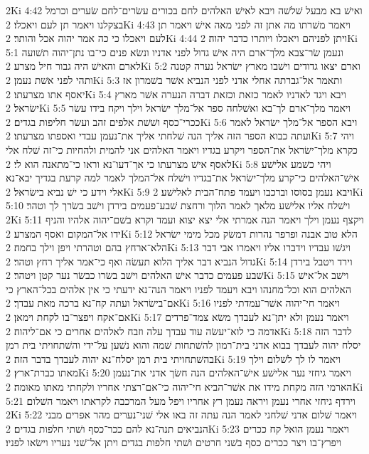 2Ki 4:42  ואישׁ בא מבעל שׁלשׁה ויבא לאישׁ האלהים לחם בכורים עשׂרים־לחם שׂערים וכרמל בצקלנו ויאמר תן לעם ויאכלו׃
2Ki 4:43  ויאמר משׁרתו מה אתן זה לפני מאה אישׁ ויאמר תן לעם ויאכלו כי כה אמר יהוה אכל והותר׃
2Ki 4:44  ויתן לפניהם ויאכלו ויותרו כדבר יהוה׃
2Ki 5:1  ונעמן שׂר־צבא מלך־ארם היה אישׁ גדול לפני אדניו ונשׂא פנים כי־בו נתן־יהוה תשׁועה לארם והאישׁ היה גבור חיל מצרע׃
2Ki 5:2  וארם יצאו גדודים וישׁבו מארץ ישׂראל נערה קטנה ותהי לפני אשׁת נעמן׃
2Ki 5:3  ותאמר אל־גברתה אחלי אדני לפני הנביא אשׁר בשׁמרון אז יאסף אתו מצרעתו׃
2Ki 5:4  ויבא ויגד לאדניו לאמר כזאת וכזאת דברה הנערה אשׁר מארץ ישׂראל׃
2Ki 5:5  ויאמר מלך־ארם לך־בא ואשׁלחה ספר אל־מלך ישׂראל וילך ויקח בידו עשׂר ככרי־כסף ושׁשׁת אלפים זהב ועשׂר חליפות בגדים׃
2Ki 5:6  ויבא הספר אל־מלך ישׂראל לאמר ועתה כבוא הספר הזה אליך הנה שׁלחתי אליך את־נעמן עבדי ואספתו מצרעתו׃
2Ki 5:7  ויהי כקרא מלך־ישׂראל את־הספר ויקרע בגדיו ויאמר האלהים אני להמית ולהחיות כי־זה שׁלח אלי לאסף אישׁ מצרעתו כי אך־דעו־נא וראו כי־מתאנה הוא לי׃
2Ki 5:8  ויהי כשׁמע אלישׁע אישׁ־האלהים כי־קרע מלך־ישׂראל את־בגדיו וישׁלח אל־המלך לאמר למה קרעת בגדיך יבא־נא אלי וידע כי ישׁ נביא בישׂראל׃
2Ki 5:9  ויבא נעמן בסוסו וברכבו ויעמד פתח־הבית לאלישׁע׃
2Ki 5:10  וישׁלח אליו אלישׁע מלאך לאמר הלוך ורחצת שׁבע־פעמים בירדן וישׁב בשׂרך לך וטהר׃
2Ki 5:11  ויקצף נעמן וילך ויאמר הנה אמרתי אלי יצא יצוא ועמד וקרא בשׁם־יהוה אלהיו והניף ידו אל־המקום ואסף המצרע׃
2Ki 5:12  הלא טוב אבנה ופרפר נהרות דמשׂק מכל מימי ישׂראל הלא־ארחץ בהם וטהרתי ויפן וילך בחמה׃
2Ki 5:13  ויגשׁו עבדיו וידברו אליו ויאמרו אבי דבר גדול הנביא דבר אליך הלוא תעשׂה ואף כי־אמר אליך רחץ וטהר׃
2Ki 5:14  וירד ויטבל בירדן שׁבע פעמים כדבר אישׁ האלהים וישׁב בשׂרו כבשׂר נער קטן ויטהר׃
2Ki 5:15  וישׁב אל־אישׁ האלהים הוא וכל־מחנהו ויבא ויעמד לפניו ויאמר הנה־נא ידעתי כי אין אלהים בכל־הארץ כי אם־בישׂראל ועתה קח־נא ברכה מאת עבדך׃
2Ki 5:16  ויאמר חי־יהוה אשׁר־עמדתי לפניו אם־אקח ויפצר־בו לקחת וימאן׃
2Ki 5:17  ויאמר נעמן ולא יתן־נא לעבדך משׂא צמד־פרדים אדמה כי לוא־יעשׂה עוד עבדך עלה וזבח לאלהים אחרים כי אם־ליהוה׃
2Ki 5:18  לדבר הזה יסלח יהוה לעבדך בבוא אדני בית־רמון להשׁתחות שׁמה והוא נשׁען על־ידי והשׁתחויתי בית רמן בהשׁתחויתי בית רמן יסלח־נא יהוה לעבדך בדבר הזה׃
2Ki 5:19  ויאמר לו לך לשׁלום וילך מאתו כברת־ארץ׃
2Ki 5:20  ויאמר גיחזי נער אלישׁע אישׁ־האלהים הנה חשׂך אדני את־נעמן הארמי הזה מקחת מידו את אשׁר־הביא חי־יהוה כי־אם־רצתי אחריו ולקחתי מאתו מאומה׃
2Ki 5:21  וירדף גיחזי אחרי נעמן ויראה נעמן רץ אחריו ויפל מעל המרכבה לקראתו ויאמר השׁלום׃
2Ki 5:22  ויאמר שׁלום אדני שׁלחני לאמר הנה עתה זה באו אלי שׁני־נערים מהר אפרים מבני הנביאים תנה־נא להם ככר־כסף ושׁתי חלפות בגדים׃
2Ki 5:23  ויאמר נעמן הואל קח ככרים ויפרץ־בו ויצר ככרים כסף בשׁני חרטים ושׁתי חלפות בגדים ויתן אל־שׁני נעריו וישׂאו לפניו׃
